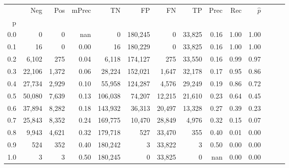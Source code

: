 \begin{tabular}{rrrrrrrrrrrrrr}
\toprule
{} &     Neg &    Pos & mPrec &       TN &       FP &      FN &      TP &  Prec &   Rec & $\hat{p}$ \\
p   &         &        &       &          &          &         &         &       &       &           \\
\midrule
0.0 &       0 &      0 &   nan &        0 &  180,245 &       0 &  33,825 &  0.16 &  1.00 &      1.00 \\
0.1 &      16 &      0 &  0.00 &       16 &  180,229 &       0 &  33,825 &  0.16 &  1.00 &      1.00 \\
0.2 &   6,102 &    275 &  0.04 &    6,118 &  174,127 &     275 &  33,550 &  0.16 &  0.99 &      0.97 \\
0.3 &  22,106 &  1,372 &  0.06 &   28,224 &  152,021 &   1,647 &  32,178 &  0.17 &  0.95 &      0.86 \\
0.4 &  27,734 &  2,929 &  0.10 &   55,958 &  124,287 &   4,576 &  29,249 &  0.19 &  0.86 &      0.72 \\
0.5 &  50,080 &  7,639 &  0.13 &  106,038 &   74,207 &  12,215 &  21,610 &  0.23 &  0.64 &      0.45 \\
0.6 &  37,894 &  8,282 &  0.18 &  143,932 &   36,313 &  20,497 &  13,328 &  0.27 &  0.39 &      0.23 \\
0.7 &  25,843 &  8,352 &  0.24 &  169,775 &   10,470 &  28,849 &   4,976 &  0.32 &  0.15 &      0.07 \\
0.8 &   9,943 &  4,621 &  0.32 &  179,718 &      527 &  33,470 &     355 &  0.40 &  0.01 &      0.00 \\
0.9 &     524 &    352 &  0.40 &  180,242 &        3 &  33,822 &       3 &  0.50 &  0.00 &      0.00 \\
1.0 &       3 &      3 &  0.50 &  180,245 &        0 &  33,825 &       0 &   nan &  0.00 &      0.00 \\
\bottomrule
\end{tabular}
